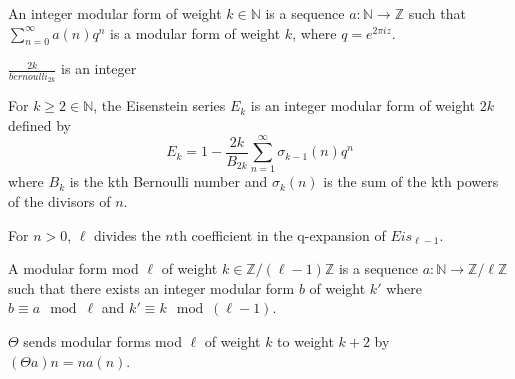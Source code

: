 \begin{definition} 
  \label{def:IntegerModularForm}
  \leanok
  An integer modular form of weight $k \in \mathbb{N}$ is a sequence $a : \mathbb{N} → \mathbb{Z}$
  such that $\sum_{n=0}^{\infty} a(n) q^n$ is a modular form of weight $k$, where $q = e ^ {2 \pi i z}.$
\end{definition}

\begin{theorem}
  \label{thm:num_two_mul_bernoulli}
  \leanok
  $\frac{2k}{bernoulli_{2k}}$ is an integer

\end{theorem}


\begin{definition} 
  \label{def:Eis}
  \leanok
  For $k \ge 2 \in \mathbb{N}$, the Eisenstein series $E_k$ is an integer modular form of weight $2k$ defined by 
  \[ E_k = 1 - \frac{2k}{B_{2k}} \sum_{n = 1}^{\infty} \sigma_{k - 1} (n) q ^ n \]
  where $B_k$ is the kth Bernoulli number and $\sigma_{k} (n)$ is the sum of the kth powers of the divisors of $n$.
\end{definition}


\begin{theorem}
  \label{thm:dvd_coeff_succ_El}
  \leanok

  For $n > 0$, $\ell$ divides the $n$th coefficient in the q-expansion of $Eis_{\ell - 1}$.
\end{theorem}


\begin{definition} 
  \label{def:ModularFormMod}
  \leanok
  A modular form mod $\ell$ of weight $k \in \mathbb{Z} / (\ell - 1) \mathbb{Z}$ is a sequence $a : \mathbb{N} → \mathbb{Z} / \ell \mathbb{Z}$
  such that there exists an integer modular form $b$ of weight $k'$ where
  $b \equiv a \mod \ell$ and $k' \equiv k \mod (\ell - 1)$.
\end{definition}


\begin{definition} [Theta]
  \label{def:Theta}
  $\Theta$ sends modular forms mod $\ell$ of weight $k$ to weight $k + 2$ by \\
  $(\Theta a) n = n a(n).$

\end{definition}

